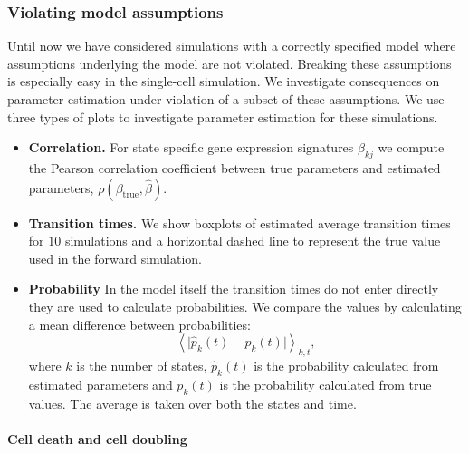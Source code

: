 \subsubsection{Violating model assumptions}
\label{sec:viol-model-assumpt}

Until now we have considered simulations with a correctly specified model where assumptions underlying the model are not violated. Breaking these assumptions is especially easy in the single-cell simulation. We investigate consequences on parameter estimation under violation of a subset of these assumptions. We use three types of plots to investigate parameter estimation for these simulations. 

\begin{itemize}
\item {\bf Correlation.} For state specific gene expression signatures $\beta_{kj}$ we compute the Pearson correlation coefficient between true parameters and estimated parameters, $\rho(\beta_{\mathrm{true}},\hat{\beta})$.
\item {\bf Transition times.} We show boxplots of estimated average transition times for $10$ simulations and a horizontal dashed line to represent the true value used in the forward simulation.
\item {\bf Probability} In the model itself the transition times do not enter directly they are used to calculate probabilities. We compare the values by calculating a mean difference between probabilities:
\begin{equation}
  \label{eq:1}
  \left< \lvert \hat{p}_k(t) - p_k(t) \rvert \right>_{k,t}, 
\end{equation}
where $k$ is the number of states, $\hat{p}_k(t)$ is the probability calculated from estimated parameters and $p_k(t)$ is
the probability calculated from true values. The average is taken over both the states and time. 
\end{itemize}



\paragraph{Cell death and cell doubling}
\label{sec:death-duplication}

